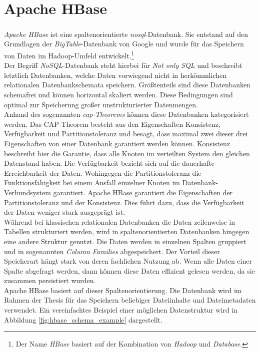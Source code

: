 \section{Apache HBase}
\label{sec:theory_hbase}
\textit{Apache HBase\textsuperscript{\textregistered}} ist eine spaltenorientierte \textit{\acrshort{nosql}}-Datenbank. Sie entstand auf den Grundlagen der \textit{BigTable}-Datenbank von Google und wurde für das Speichern von Daten im Hadoop-Umfeld entwickelt.\footnote{Der Name \textit{HBase} basiert auf der Kombination von \textit{Hadoop} und \textit{Database}.}\\
Der Begriff \textit{NoSQL}-Datenbank steht hierbei für \textit{Not only SQL} und beschreibt letztlich Datenbanken, welche Daten vorwiegend nicht in herkömmlichen relationalen Datenbankschemata speichern. Größtenteils sind diese Datenbanken schemafrei und können horizontal skaliert werden. Diese Bedingungen sind optimal zur Speicherung großer unstrukturierter Datenmengen.\\
Anhand des sogenannten \textit{\acrshort{cap}-Theorems} können diese Datenbanken kategorisiert werden.
Das CAP-Theorem besteht aus den Eigenschaften Konsistenz, Verfügbarkeit und Partitionstoleranz und besagt, dass maximal zwei dieser drei Eigenschaften von einer Datenbank garantiert werden können. Konsistenz beschreibt hier die Garantie, dass alle Knoten im verteilten System den gleichen Datenstand haben. Die Verfügbarkeit bezieht sich auf die dauerhafte Erreichbarkeit der Daten. Wohingegen die Partitionstoleranz die Funktionsfähigkeit bei einem Ausfall einzelner Knoten im Datenbank-Verbundsystem garantiert.
Apache HBase garantiert die Eigenschaften der Partitionstoleranz und der Konsistenz. Dies führt dazu, dass die Verfügbarkeit der Daten weniger stark ausgeprägt ist.
\cite[S. 189 ff.]{big_data_praxis}\\

\noindent
Während bei klassischen relationalen Datenbanken die Daten zeilenweise in Tabellen strukturiert werden, wird in spaltenorientierten Datenbanken hingegen eine andere Struktur genutzt. Die Daten werden in einzelnen Spalten gruppiert und in sogenannten \textit{Column Families} abgespeichert. Der Vorteil dieser Speicherart hängt stark von deren fachlichen Nutzung ab. Wenn alle Daten einer Spalte abgefragt werden, dann können diese Daten effizient gelesen werden, da sie zusammen persistiert wurden.\\ 
Apache HBase basiert auf dieser Spaltenorientierung. Die Datenbank wird im Rahmen der Thesis für das Speichern beliebiger Dateiinhalte und Dateimetadaten verwendet. Ein vereinfachtes Beispiel einer möglichen Datenstruktur wird in Abbildung \ref{fig:hbase_schema_example} dargestellt.\\

